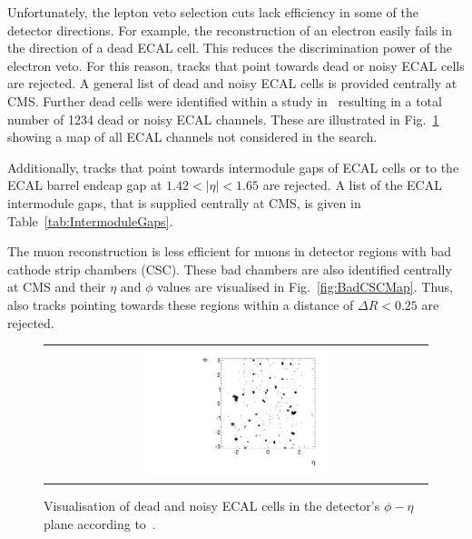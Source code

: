 Unfortunately, the lepton veto selection cuts lack efficiency in some of the detector directions.
For example, the reconstruction of an electron easily fails in the direction of a dead ECAL cell.
This reduces the discrimination power of the electron veto.
For this reason, tracks that point towards dead or noisy ECAL cells are rejected.
A general list of dead and noisy ECAL cells is provided centrally at CMS.
Further dead cells were identified within a study in~\cite{bib:CMS:DT_Thesis,bib:CMS:DT_8TeV_AN} resulting in a total number of 1234 dead or noisy ECAL channels. 
These are illustrated in Fig.~\ref{fig:DeadECALmap} showing a map of all ECAL channels not considered in the search.


Additionally, tracks that point towards intermodule gaps of ECAL cells or to the ECAL barrel endcap gap at $1.42<|\eta|<1.65$ are rejected.
A list of the ECAL intermodule gaps, that is supplied centrally at CMS, is given in Table~\ref{tab:IntermoduleGaps}.

The muon reconstruction is less efficient for muons in detector regions with bad cathode strip chambers (CSC).
These bad chambers are also identified centrally at CMS and their $\eta$ and $\phi$ values are visualised in Fig.~\ref{fig:BadCSCMap}.
Thus, also tracks pointing towards these regions within a distance of $\Delta R<0.25$ are rejected.

\begin{figure}[!t]
  \centering 
  \begin{tabular}{c}
    \includegraphics[width=0.49\textwidth]{figures/analysis/DeadECALMap.pdf}
  \end{tabular}
  \caption{Visualisation of dead and noisy ECAL cells in the detector's $\phi - \eta$ plane according to~\cite{bib:CMS:DT_Thesis,bib:CMS:DT_8TeV_AN}.}
  \label{fig:DeadECALmap}
\end{figure}

